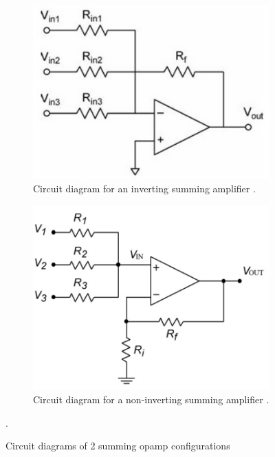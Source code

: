 \begin{figure}[H]
\footnotesize
\centering
\begin{subfigure}[]{0.35\textwidth}
\includegraphics[width=\linewidth]{./Figures/DAC_InvAmp.png}
\caption{Circuit diagram for an inverting summing amplifier \cite{Lit_SumAmp}.}
\label{subfig:inv_sum_amp}	
\end{subfigure}
\begin{subfigure}[]{0.35\textwidth}
\includegraphics[width=\linewidth]{./Figures/DAC_NonInvAmp.png}
\caption{Circuit diagram for a non-inverting summing amplifier \cite{Lit_SumAmp}.}
\label{subfig:noninv_sum_amp}	
\end{subfigure}
\caption {Circuit diagrams of 2 summing opamp configurations}.
\label{fig:circuit_diagram}
\end{figure}
